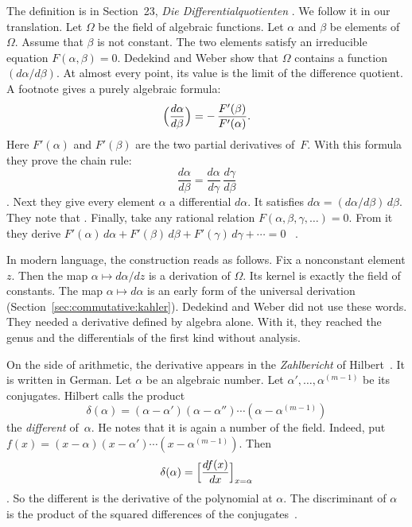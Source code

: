 The definition is in Section~23, \emph{Die Differentialquotienten}
\cite[\S 23, p.~259]{DedekindWeber1882}. We
follow it in our translation. Let $\Omega$ be the field of algebraic
functions. Let $\alpha$ and $\beta$ be elements of $\Omega$. Assume that
$\beta$ is not constant. The two elements satisfy an irreducible equation
$F(\alpha,\beta) = 0$. Dedekind and Weber show that $\Omega$ contains a
function $(d\alpha/d\beta)$. At almost every point, its value is the limit of
the difference quotient. A footnote gives a purely algebraic formula:
\[
  \Bigl(\frac{d\alpha}{d\beta}\Bigr) = -\,\frac{F'(\beta)}{F'(\alpha)}.
\]
Here $F'(\alpha)$ and $F'(\beta)$ are the two partial derivatives of~$F$.
With this formula they prove the chain rule:
\[
  \frac{d\alpha}{d\beta} = \frac{d\alpha}{d\gamma}\,\frac{d\gamma}{d\beta}
\]
\cite[\S 23, pp.~259--260]{DedekindWeber1882}. Next they give every element
$\alpha$ a differential $d\alpha$. It satisfies $d\alpha =
(d\alpha/d\beta)\, d\beta$. They note that . Finally, take any
rational relation $F(\alpha,\beta,\gamma,\ldots) = 0$. From it they derive
$F'(\alpha)\,d\alpha + F'(\beta)\,d\beta + F'(\gamma)\,d\gamma + \cdots = 0$%
~\cite[\S 23, p.~261]{DedekindWeber1882}.

In modern language, the construction reads as follows. Fix a nonconstant element $z$. Then the map $\alpha \mapsto d\alpha/dz$ is a
derivation of $\Omega$. Its kernel is exactly the field of constants. The map
$\alpha \mapsto d\alpha$ is an early form of the universal derivation
(Section~\ref{sec:commutative:kahler}). Dedekind and Weber did not use these
words. They needed a derivative defined by algebra alone. With it, they
reached the genus and the differentials of the first kind without analysis.

On the side of arithmetic, the derivative appears in the \emph{Zahlbericht} of Hilbert~\cite{Hilbert1897}. It is written in German.
Let $\alpha$ be an algebraic number. Let $\alpha', \ldots, \alpha^{(m-1)}$ be
its conjugates. Hilbert calls the product
\[
  \delta(\alpha) = (\alpha-\alpha')(\alpha-\alpha'')\cdots(\alpha-\alpha^{(m-1)})
\]
the \emph{different} of~$\alpha$. He notes that it is again a number of the
field. Indeed, put $f(x) = (x-\alpha)(x-\alpha')\cdots(x-\alpha^{(m-1)})$.
Then
\[
  \delta(\alpha) = \Bigl[\frac{df(x)}{dx}\Bigr]_{x=\alpha}
\]
\cite[\S 3, p.~179]{Hilbert1897}. So the different is the derivative of the
polynomial at $\alpha$. The discriminant of $\alpha$ is the product of the
squared differences of the conjugates~\cite[\S 3, p.~179]{Hilbert1897}.

